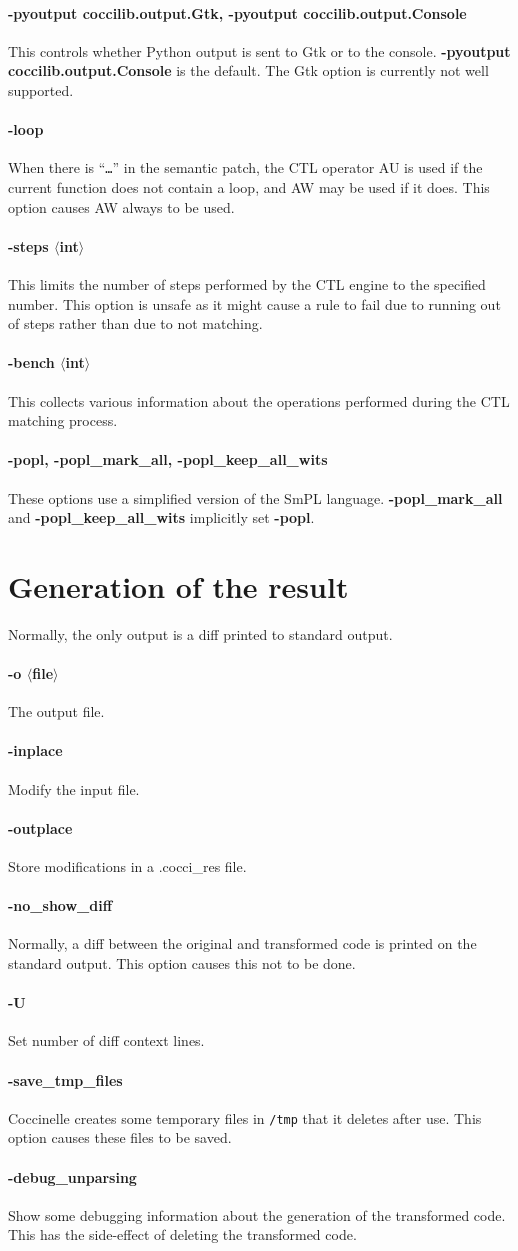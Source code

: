 \documentclass{article}
\newcommand{\rare}[2]{\paragraph*{\makebox[0in][r]{\BigDiamondshape\,\,} {{#1}}} {#2}}
\newcommand{\developer}[2]{\paragraph*{{#1}} {#2}}
\begin{document}
\rare{-pyoutput coccilib.output.Gtk, -pyoutput coccilib.output.Console}{
This controls whether Python output is sent to Gtk or to the console.  {\bf
  -pyoutput coccilib.output.Console} is the default.  The Gtk option is
currently not well supported.}

\developer{-loop}{When there is ``{\tt{\ldots}}'' in the semantic patch,
  the CTL operator {\sf AU} is used if the current function does not
  contain a loop, and {\sf AW} may be used if it does.  This option causes
  {\sf AW} always to be used.}

\developer{-steps $\langle$int$\rangle$}{
This limits the number of steps performed by the CTL engine to the
specified number.  This option is unsafe as it might cause a rule to fail
due to running out of steps rather than due to not matching.}

\developer{-bench $\langle$int$\rangle$}{This collects various information
  about the operations performed during the CTL matching process.}

\developer{-popl, -popl\_mark\_all, -popl\_keep\_all\_wits}{
These options use a simplified version of the SmPL language.  {\bf
  -popl\_mark\_all} and {\bf -popl\_keep\_all\_wits} implicitly set {\bf
  -popl}.}

\section{Generation of the result}

Normally, the only output is a diff printed to standard output.

\rare{-o $\langle$file$\rangle$}{ The output file.}

\rare{-inplace}{ Modify the input file.}

\rare{-outplace}{ Store modifications in a .cocci\_res file.}

\rare{-no\_show\_diff}{ Normally, a diff between the original and transformed
code is printed on the standard output.  This option causes this not to be
done.}

\rare{-U}{ Set number of diff context lines.}

\rare{-save\_tmp\_files}{Coccinelle creates some temporary
  files in {\tt /tmp} that it deletes after use.  This option causes these
  files to be saved.}

\developer{-debug\_unparsing}{Show some debugging information about the
  generation of the transformed code.  This has the side-effect of
  deleting the transformed code.}
\end{document}
